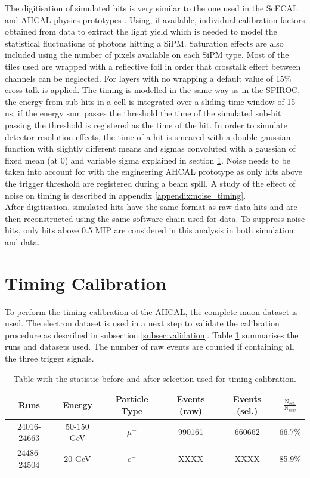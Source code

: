 \documentclass[twoside,a4paper,11pt]{article}
\begin{document}
The digitisation of simulated hits is very similar to the one used in the ScECAL and AHCAL physics prototypes \cite{CAN-002, CAN-010, JINST-6}. Using, if available, individual calibration factors obtained from data to extract the light yield which is needed to model the statistical fluctuations of photons hitting a SiPM. Saturation effects are also included using the number of pixels available on each SiPM type. Most of the tiles used are wrapped with a reflective foil in order that crosstalk effect between channels can be neglected. For layers with no wrapping a default value of 15\% cross-talk is applied. The timing is modelled in the same way as in the SPIROC, the energy from sub-hits in a cell is integrated over a sliding time window of 15 ns, if the energy sum passes the threshold the time of the simulated sub-hit passing the threshold is registered as the time of the hit. In order to simulate detector resolution effects, the time of a hit is smeared with a double gaussian function with slightly different means and sigmas convoluted with a gaussian of fixed mean (at 0) and variable sigma explained in section \ref{}. Noise needs to be taken into account for with the engineering AHCAL prototype as only hits above the trigger threshold are registered during a beam spill. A study of the effect of noise on timing is described in appendix \ref{appendix:noise_timing}.\\
After digitisation, simulated hits have the same format as raw data hits and are then reconstructed using the same software chain used for data. To suppress noise hits, only hits above 0.5 MIP are considered in this analysis in both simulation and data.

\section{Timing Calibration}

To perform the timing calibration of the AHCAL, the complete muon dataset is used. The electron dataset is used in a next step to validate the calibration procedure as described in subsection \ref{subsec:validation}. Table \ref{table:mu_elec_runs} summarises the runs and datasets used. The number of raw events are counted if containing all the three trigger signals.
\begin{table}[htbp]
\centering
  \begin{tabular}{@{} cccccc @{}}
    \hline
    Runs & Energy & Particle Type & Events (raw) & Events (sel.) & $\frac{\text{N$_{sel.}$}}{\text{N$_{raw}$}}$ \\ 
    \hline
     24016-24663 & 50-150 GeV & $\mu^-$ & 990161 & 660662 & 66.7\% \\ 
     24486-24504 & 20 GeV & $e^-$ & XXXX & XXXX & 85.9\% \\
    \hline
  \end{tabular}
  \caption{Table with the statistic before and after selection used for timing calibration.}
  \label{table:mu_elec_runs}
\end{table}
\end{document}
